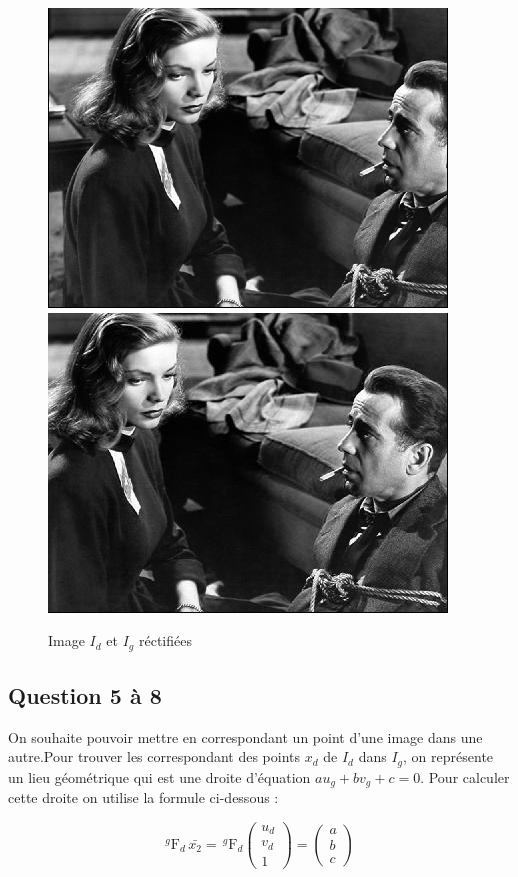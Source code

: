 \documentclass[12pt]{report}
\begin{document}
\begin{figure}
\begin{center}
\includegraphics[scale=0.5]{Image/Id.jpg} 
\includegraphics[scale=0.5]{Image/Ig.jpg} 
\caption{Image $I_d$ et $I_g$ réctifiées}
\end{center}
\end{figure}

\subsection*{Question 5 à 8}

On souhaite pouvoir mettre en correspondant un point d'une image dans une autre.Pour trouver les correspondant des points $x_d$ de $I_d$ dans $I_g$, on représente un lieu géométrique qui est une droite d'équation $au_g + bv_g + c = 0$. Pour calculer cette droite on utilise la formule ci-dessous :

\[^{g}\textrm{F}_d \, \bar{x_2} = \, ^{g}\textrm{F}_d \begin{pmatrix}u_d\\ v_d\\ 1\end{pmatrix} = \begin{pmatrix}
a\\ 
b\\ 
c
\end{pmatrix}\] 
\end{document}
